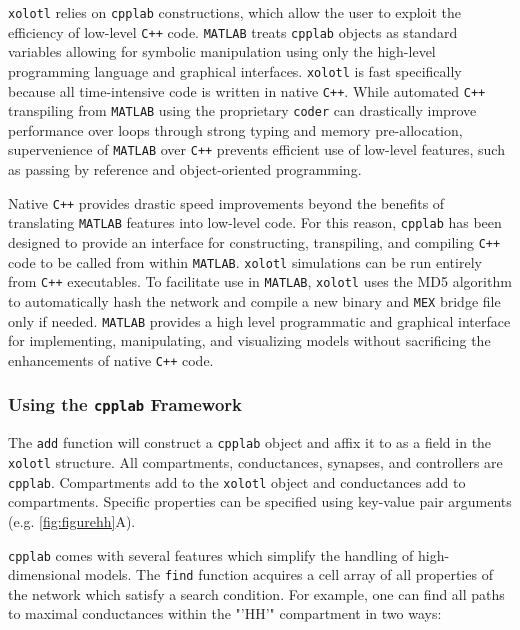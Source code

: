 \documentclass{frontiersSCNS} %
\begin{document}
\texttt{xolotl} relies on \texttt{cpplab} constructions, which allow the user to exploit the efficiency of low-level \texttt{C++} code. \texttt{MATLAB} treats \texttt{cpplab} objects as standard variables allowing for symbolic manipulation using only the high-level programming language and graphical interfaces. \texttt{xolotl} is fast specifically because all time-intensive code is written in native \texttt{C++}. While automated \texttt{C++} transpiling from \texttt{MATLAB} using the proprietary \texttt{coder} can drastically improve performance over loops through strong typing and memory pre-allocation, supervenience of \texttt{MATLAB} over \texttt{C++} prevents efficient use of low-level features, such as passing by reference and object-oriented programming. 

Native \texttt{C++} provides drastic speed improvements beyond the benefits of translating \texttt{MATLAB} features into low-level code. For this reason, \texttt{cpplab} has been designed to provide an interface for constructing, transpiling, and compiling \texttt{C++} code to be called from within \texttt{MATLAB}. \texttt{xolotl} simulations can be run entirely from \texttt{C++} executables. To facilitate use in \texttt{MATLAB}, \texttt{xolotl} uses the MD5 algorithm to automatically hash the network and compile a new binary and \texttt{MEX} bridge file only if needed. \texttt{MATLAB} provides a high level programmatic and graphical interface for implementing, manipulating, and visualizing models without sacrificing the enhancements of native \texttt{C++} code.

\subsubsection{Using the \texttt{cpplab} Framework}

The \texttt{add} function will construct a \texttt{cpplab} object and affix it to as a field in the \texttt{xolotl} structure. All compartments, conductances, synapses, and controllers are \texttt{cpplab}. Compartments add to the \texttt{xolotl} object and conductances add to compartments. Specific properties can be specified using key-value pair arguments (e.g. \ref{fig:figurehh}A).

\texttt{cpplab} comes with several features which simplify the handling of high-dimensional models. The \texttt{find} function acquires a cell array of all properties of the network which satisfy a search condition. For example, one can find all paths to maximal conductances within the "'HH'" compartment in two ways:
\end{document}
